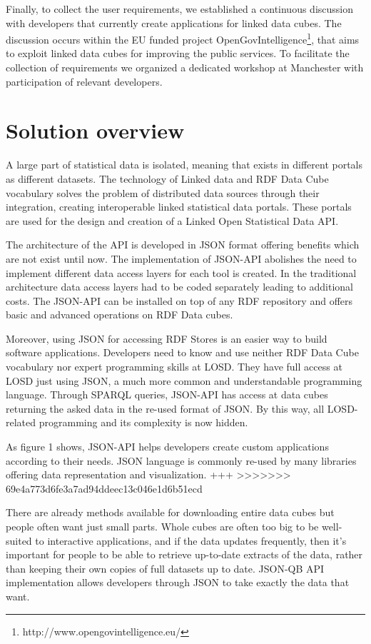 \documentclass{llncs}
\begin{document}
Finally, to collect the user requirements, we established a continuous discussion with developers that currently create applications for linked data cubes. The discussion occurs within the EU funded project OpenGovIntelligence\footnote{http://www.opengovintelligence.eu/}, that aims to exploit linked data cubes for improving the public services. To facilitate the collection of requirements we organized a dedicated workshop at Manchester with participation of relevant developers. 


\section{Solution overview}\label{sec:overview}

A large part of statistical data is isolated, meaning that exists in different portals as different datasets. The technology of Linked data and RDF Data Cube vocabulary solves the problem of distributed data sources through their integration, creating interoperable linked statistical data portals. These portals are used for the design and creation of a Linked Open Statistical Data API.
 
The architecture of the API is developed in JSON format offering benefits which are not exist until now. The implementation of JSON-API abolishes the need to implement different data access layers for each tool is created. In the traditional architecture data access layers had to be coded separately leading to additional costs. The JSON-API can be installed on top of any RDF repository and offers basic and advanced operations on RDF Data cubes.
 
Moreover, using JSON for accessing RDF Stores is an easier way to build software applications. Developers need to know and use neither RDF Data Cube vocabulary nor expert programming skills at LOSD. They have full access at LOSD just using JSON, a much more common and understandable programming language. Through SPARQL queries, JSON-API has access at data cubes returning the asked data in the re-used format of JSON. By this way, all LOSD-related programming and its complexity is now hidden.

As figure 1 shows, JSON-API helps developers create custom applications according to their needs. JSON language is commonly re-used by many libraries offering data representation and visualization. +++
>>>>>>> 69e4a773d6fe3a7ad94ddeec13c046e1d6b51ecd

There are already methods available for downloading entire data cubes but people often want just small parts.  Whole cubes are often too big to be well-suited to interactive applications, and if the data updates frequently, then it's important for people to be able to retrieve up-to-date extracts of the data, rather than keeping their own copies of full datasets up to date. JSON-QB API implementation allows developers through JSON to take exactly the data that want.
 
\end{document}
